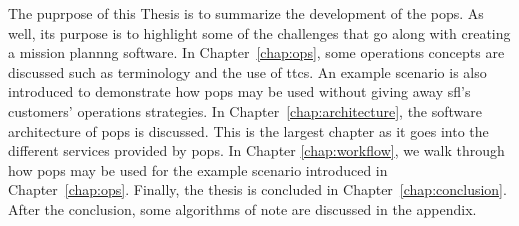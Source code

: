 The puprpose of this Thesis is to summarize the development of the
\acrlong{pops}. As well, its purpose is to highlight some of the challenges
that go along with creating a mission plannng software. In
Chapter~\ref{chap:ops}, some operations concepts are discussed such as
terminology and the use of \glspl{ttc}. An example scenario is also introduced
to demonstrate how \gls{pops} may be used without giving away \gls{sfl}'s
customers' operations strategies. In Chapter~\ref{chap:architecture}, the
software architecture of \gls{pops} is discussed. This is the largest chapter
as it goes into the different services provided by \gls{pops}. In Chapter
\ref{chap:workflow}, we walk through how \gls{pops} may be used for the example
scenario introduced in Chapter~\ref{chap:ops}. Finally, the thesis is concluded
in Chapter~\ref{chap:conclusion}. After the conclusion, some algorithms of note
are discussed in the appendix.




